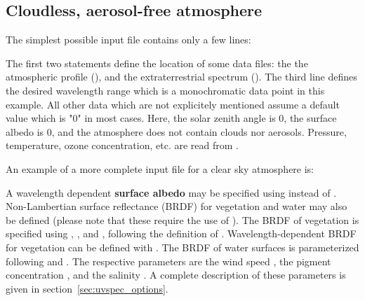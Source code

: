 \subsection{Cloudless, aerosol-free atmosphere}

The simplest possible input file contains only a few lines:

The first two statements define the location of some data files: the
the atmospheric profile
(), 
and the extraterrestrial spectrum 
(). The third line
defines the desired wavelength range which is a monochromatic data
point in this example. All other data which are not explicitely
mentioned assume a default value which is "0" in most cases. Here, the
solar zenith angle is 0, the surface albedo is 0, and the atmosphere
does not contain clouds nor aerosols. Pressure, temperature, ozone
concentration, etc. are read from .

An example of a more complete input file for a clear sky atmosphere is:


A wavelength dependent {\bf surface albedo}
may be specified using
 instead of . Non-Lambertian surface
reflectance (BRDF)  for vegetation and water may also be defined
(please note that these require the use of ). The BRDF of vegetation is specified using ,
, and , following the definition of
\citet{rahman93a}. Wavelength-dependent BRDF for vegetation can be
defined with . The BRDF of water surfaces is
parameterized following \citet{cox54a, cox54b} and \citet{nakajima83}.
The respective parameters are the wind speed
, the pigment concentration
, and the salinity
. A complete description of these parameters
is given in section~\ref{sec:uvspec_options}.

